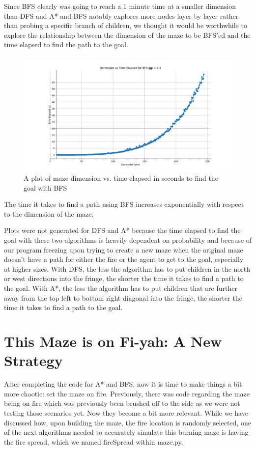 \documentclass[11pt]{article}
\begin{document}
Since BFS clearly was going to reach a 1 minute time at a smaller dimension than DFS and A* and BFS notably explores more nodes layer by layer rather than probing a specific branch of children, we thought it would be worthwhile to explore the relationship between the dimension of the maze to be BFS'ed and the time elapsed to find the path to the goal.
\begin{figure}[h]
\centering
\includegraphics[scale=0.5]{dimVStimeBFS_MAX243.PNG}
\caption{A plot of maze dimension vs. time elapsed in seconds to find the goal with BFS}
\label{BFStime}
\end{figure}
The time it takes to find a path using BFS increases exponentially with respect to the dimension of the maze.

Plots were not generated for DFS and A* because the time elapsed to find the goal with these two algorithms is heavily dependent on probability and because of our program freezing upon trying to create a new maze when the original maze doesn't have a path for either the fire or the agent to get to the goal, especially at higher sizes. With DFS, the less the algorithm has to put children in the north or west directions into the fringe, the shorter the time it takes to find a path to the goal. With A*, the less the algorithm has to put children that are further away from the top left to bottom right diagonal into the fringe, the shorter the time it takes to find a path to the goal.
	\pagebreak
\section{This Maze is on Fi-yah: A New Strategy}
After completing the code for A* and BFS, now it is time to make things a bit more chaotic: set the maze on fire. Previously, there was code regarding the maze being on fire which was previously been brushed off to the side as we were not testing those scenarios yet. Now they become a bit more relevant.
While we have discussed how, upon building the maze, the fire location is randomly selected, one of the next algorithms needed to accurately simulate this burning maze is having the fire spread, which we named fireSpread within maze.py.
\end{document}
